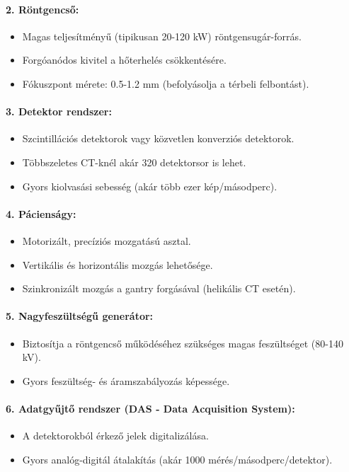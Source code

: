 \documentclass[a4paper,12pt]{article}
\begin{document}
\paragraph{2. Röntgencső:} \begin{itemize} \item Magas teljesítményű (tipikusan 20-120 kW) röntgensugár-forrás. \item Forgóanódos kivitel a hőterhelés csökkentésére. \item Fókuszpont mérete: 0.5-1.2 mm (befolyásolja a térbeli felbontást). \end{itemize}

\paragraph{3. Detektor rendszer:} \begin{itemize} \item Szcintillációs detektorok vagy közvetlen konverziós detektorok. \item Többszeletes CT-knél akár 320 detektorsor is lehet. \item Gyors kiolvasási sebesség (akár több ezer kép/másodperc). \end{itemize}

\paragraph{4. Pácienságy:} \begin{itemize} \item Motorizált, precíziós mozgatású asztal. \item Vertikális és horizontális mozgás lehetősége. \item Szinkronizált mozgás a gantry forgásával (helikális CT esetén). \end{itemize}

\paragraph{5. Nagyfeszültségű generátor:} \begin{itemize} \item Biztosítja a röntgencső működéséhez szükséges magas feszültséget (80-140 kV). \item Gyors feszültség- és áramszabályozás képessége. \end{itemize}

\paragraph{6. Adatgyűjtő rendszer (DAS - Data Acquisition System):} \begin{itemize} \item A detektorokból érkező jelek digitalizálása. \item Gyors analóg-digitál átalakítás (akár 1000 mérés/másodperc/detektor). \end{itemize}
\end{document}

